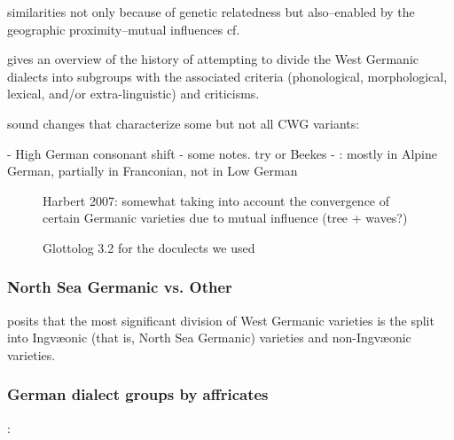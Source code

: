 \documentclass[a4paper]{article}
\begin{document}
similarities not only because of genetic relatedness but also--enabled by the geographic proximity--mutual influences
cf. \citet[p. 8]{harbert2007germanic}

\citet[pp. 72-80]{nielsen1989germanic} gives an overview of the history of attempting to divide the West Germanic dialects into subgroups with the associated criteria (phonological, morphological, lexical, and/or extra-linguistic) and criticisms.

sound changes that characterize some but not all CWG variants:

- High German consonant shift
  - some notes. try \citet[pp. 47-48]{harbert2007germanic} or Beekes
  - \citet[p. 15]{harbert2007germanic}: mostly in Alpine German, partially in Franconian, not in Low German


\begin{figure}
\centering

\caption{Harbert 2007: somewhat taking into account the convergence of certain Germanic varieties due to mutual influence (tree + waves?)}
\label{fig:cwg_harbert}
\end{figure}


\begin{figure}
\begin{adjustwidth}{-3cm}{-3cm}
\centering
\scalebox{0.8}{

}
\end{adjustwidth}
% 
\caption{Glottolog 3.2 for the doculects we used}
\end{figure}

\subsubsection{North Sea Germanic vs. Other}
\citet{stiles2013pan-west} posits that the most significant division of West Germanic varieties is the split into Ingv\ae{}onic (that is, North Sea Germanic) varieties and non-Ingv\ae{}onic varieties.

\subsubsection{German dialect groups by affricates}
\citet[pp. 182-199]{goblirsch2005lautverschiebungen}:
\end{document}
